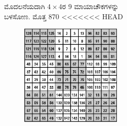 \begin{figure}[H]
\begin{figure}[H]
\begin{figure}[h]
ಮೊದಲನೆಯದಾಗಿ $4 \times 4$ರ 9 ಮಾಯಾಚೌಕಗಳನ್ನು ಬಳಸೋಣ. ಮೊತ್ತ 870
<<<<<<< HEAD
\begin{figure}[h]
\includegraphics{src/figures/chap3/fig3-33.eps}
\end{figure}


\end{figure}
\end{figure}
\end{figure}
